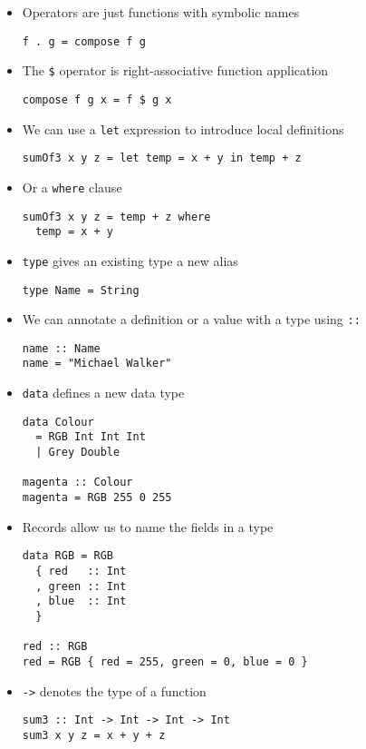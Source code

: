 \begin{itemize}
\item Operators are just functions with symbolic names
\begin{verbatim}
f . g = compose f g
\end{verbatim}

\item The \verb|$| operator is right-associative function application
\begin{verbatim}
compose f g x = f $ g x
\end{verbatim}

\item We can use a \verb|let| expression to introduce local definitions
\begin{verbatim}
sumOf3 x y z = let temp = x + y in temp + z
\end{verbatim}

\item Or a \verb|where| clause
\begin{verbatim}
sumOf3 x y z = temp + z where
  temp = x + y
\end{verbatim}

\item \verb|type| gives an existing type a new alias
\begin{verbatim}
type Name = String
\end{verbatim}

\item We can annotate a definition or a value with a type using \verb|::|
\begin{verbatim}
name :: Name
name = "Michael Walker"
\end{verbatim}

\item \verb|data| defines a new data type
\begin{verbatim}
data Colour
  = RGB Int Int Int
  | Grey Double

magenta :: Colour
magenta = RGB 255 0 255
\end{verbatim}

\item Records allow us to name the fields in a type
\begin{verbatim}
data RGB = RGB
  { red   :: Int
  , green :: Int
  , blue  :: Int
  }

red :: RGB
red = RGB { red = 255, green = 0, blue = 0 }
\end{verbatim}

\item \verb|->| denotes the type of a function
\begin{verbatim}
sum3 :: Int -> Int -> Int -> Int
sum3 x y z = x + y + z
\end{verbatim}


\end{itemize}
